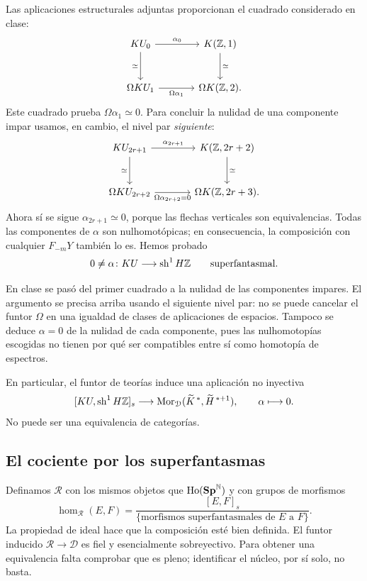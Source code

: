 Las aplicaciones estructurales adjuntas proporcionan el cuadrado considerado en clase:
\[
\begin{tikzcd}[column sep=large,row sep=large]
KU_0\arrow[r,"\alpha_0"]\arrow[d,"\simeq"']
&K(\mathbb Z,1)\arrow[d,"\simeq"]\\
\Omega KU_1\arrow[r,"\Omega\alpha_1"']&\Omega K(\mathbb Z,2).
\end{tikzcd}
\]
Este cuadrado prueba $\Omega\alpha_1\simeq0$. Para concluir la nulidad de una componente impar usamos, en cambio, el nivel par \emph{siguiente}:
\[
\begin{tikzcd}[column sep=large,row sep=large]
KU_{2r+1}\arrow[r,"\alpha_{2r+1}"]\arrow[d,"\simeq"']
&K(\mathbb Z,2r+2)\arrow[d,"\simeq"]\\
\Omega KU_{2r+2}\arrow[r,"\Omega\alpha_{2r+2}=0"']
&\Omega K(\mathbb Z,2r+3).
\end{tikzcd}
\]
Ahora sí se sigue $\alpha_{2r+1}\simeq0$, porque las flechas verticales son equivalencias. Todas las componentes de $\alpha$ son nulhomotópicas; en consecuencia, la composición con cualquier $F_{-m}Y$ también lo es. Hemos probado
\[
0\ne\alpha\colon KU\longrightarrow\operatorname{sh}^1H\mathbb Z
\qquad\text{superfantasmal}.
\]

\begin{nota}
En clase se pasó del primer cuadrado a la nulidad de las componentes impares. El argumento se precisa arriba usando el siguiente nivel par: no se puede cancelar el funtor $\Omega$ en una igualdad de clases de aplicaciones de espacios. Tampoco se deduce $\alpha=0$ de la nulidad de cada componente, pues las nulhomotopías escogidas no tienen por qué ser compatibles entre sí como homotopía de espectros.
\end{nota}

En particular, el funtor de teorías induce una aplicación no inyectiva
\[
[KU,\operatorname{sh}^1H\mathbb Z]_s\longrightarrow
\operatorname{Mor}_{\mathcal D}(\widetilde K^{\,*},\widetilde H^{\,*+1}),
\qquad\alpha\longmapsto0.
\]
No puede ser una equivalencia de categorías.

\subsection{El cociente por los superfantasmas}
Definamos $\mathcal R$ con los mismos objetos que $\operatorname{Ho}(\mathbf{Sp}^{\mathbb N})$ y con grupos de morfismos
\[
\hom_{\mathcal R}(E,F)
=\frac{[E,F]_s}{\{\text{morfismos superfantasmales de }E\text{ a }F\}}.
\]
La propiedad de ideal hace que la composición esté bien definida. El funtor inducido $\mathcal R\to\mathcal D$ es fiel y esencialmente sobreyectivo. Para obtener una equivalencia falta comprobar que es pleno; identificar el núcleo, por sí solo, no basta.

